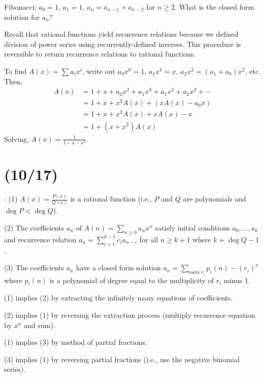 \documentclass[class=math239,notes,tikz]{agony}
\begin{document}
\begin{example}
  Fibonacci: $a_0 = 1$, $a_1 = 1$, $a_n = a_{n-1} + a_{n-2}$ for $n \geq 2$.
  What is the closed form solution for $a_n$?
\end{example}
\begin{sol}
  Recall that rational functions yield recurrence relations
  because we defined division of power series using recurrently-defined inverses.
  This procedure is reversible to return recurrence relations to rational functions.

  To find $A(x) = \sum a_i x^i$, write out $a_0x^0 = 1$, $a_1x^1 = x$,
  $a_2x^2 = (a_1 + a_0)x^2$, etc. Then,
  \begin{align*}
    A(x) & = 1 + x + a_0x^2 + a_1x^3 + a_1x^2 + a_2x^3 + \dotsb \\
         & = 1 + x + x^2 A(x) + (x A(x) - a_0x)                 \\
         & = 1 + x + x^2 A(x) + x A(x) - x                      \\
         & = 1 + (x+x^2)A(x)
  \end{align*}
  Solving, $A(x) = \frac{1}{1-x-x^2}$.
\end{sol}


\section{(10/17)}

\begin{theorem}[Case 1]\label{thm:main1}
  \TFAE: (1) $A(x) = \frac{P(x)}{Q(x)}$ is a rational function (i.e.,
  $P$ and $Q$ are polynomials and $\deg P < \deg Q$).

  (2) The coefficients $a_n$ of $A(n) = \sum_{n \geq 0} a_n x^n$
  satisfy initial conditions $a_0,\dotsc,a_k$ and recurrence relation
  $a_n = \sum_{i=1}^{k-1} c_i a_{n-i}$ for all $n \geq k+1$ where $k = \deg Q - 1$.

  (3) The coefficients $a_n$ have a closed form solution
  $a_n = \sum_{\text{roots $r_i$}} p_i(n)-(r_i)^n$
  where $p_i(n)$ is a polynomial of degree equal to the multiplicity of $r_i$ minus 1.
\end{theorem}
\begin{prf}
  (1) implies (2) by extracting the infinitely many equations of coefficients.

  (2) implies (1) by reversing the extraction process (multiply recurrence equation by $x^n$ and sum).

  (1) implies (3) by method of partial fractions.

  (3) implies (1) by reversing partial fractions (i.e., use the negative binomial series).
\end{prf}
\end{document}
